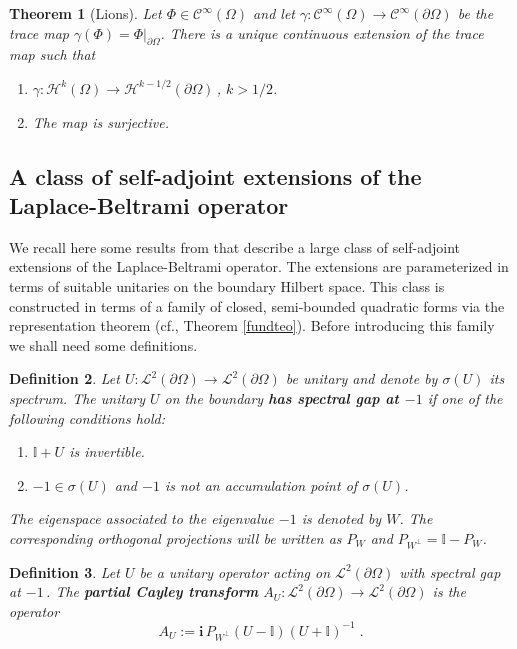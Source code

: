 \documentclass[a4paper,12pt]{amsart}
\renewcommand{\H}{\mathcal{H}}
\renewcommand{\L}{\mathcal{L}}
\newcommand{\pO}{{\partial \Omega}}
\newcommand{\C}{\mathcal{C}}
\newcommand{\1}{\mathbb{I}}
\newtheorem{theorem}{Theorem}
\newtheorem{definition}[theorem]{Definition}
\numberwithin{equation}{section}
\numberwithin{theorem}{section}
\begin{document}
\begin{theorem}[Lions]\label{LMtracetheorem}
Let $\Phi\in\C^{\infty}(\Omega)$ and let $\gamma\colon\C^\infty(\Omega)\to\C^{\infty}(\pO)$ be the trace map $\gamma(\Phi)=\Phi\bigr|_{\pO}$. 
There is a unique continuous extension of the trace map such that
\begin{enumerate}
\item $\gamma\colon\H^{k}(\Omega)\to\H^{k-1/2}(\pO)$\,, $k > 1/2$\;.\\
\item The map is surjective\;.\\
\end{enumerate}
\end{theorem}

 

\subsection{A class of self-adjoint extensions of the Laplace-Beltrami operator}

We recall here some results from \cite{ILP13} that describe a large class of self-adjoint extensions of the Laplace-Beltrami operator. 
The extensions are parameterized in terms of suitable unitaries on the boundary Hilbert space. This class is constructed in 
terms of a family of closed, semi-bounded quadratic forms via the representation theorem (cf., Theorem \ref{fundteo}). 
Before introducing this family we shall need some definitions.

\begin{definition}\label{DefGap}
Let $U\colon  \L^2(\pO)\to\L^2(\pO)$ be unitary and denote by $\sigma(U)$ its spectrum. The unitary $U$ on the boundary
\textbf{has spectral gap at $-1$} if one of the following conditions hold:
\begin{enumerate}
\item $\1+U$ is invertible.
\item $-1\in\sigma(U)$ and $-1$ is not an accumulation point of $\sigma(U)$.
\end{enumerate}
The eigenspace associated to the eigenvalue $-1$ is denoted by $W$. The corresponding orthogonal projections will be written as
$P_W$ and $P_{W^\perp}=\1-P_W$. 
\end{definition}


\begin{definition}\label{partialCayley}
Let $U$ be a unitary operator acting on $\L^2(\pO)$ with spectral gap at $-1$\,. 
The \textbf{partial Cayley transform} $A_U\colon\L^2(\pO)\to \L^2(\pO)$ is
the operator
\[
A_U:=\mathbf{i}\,P_{W^\bot} (U-\mathbb{I}) (U+\mathbb{I})^{-1}\;.
\]
\end{definition}
\end{document}
